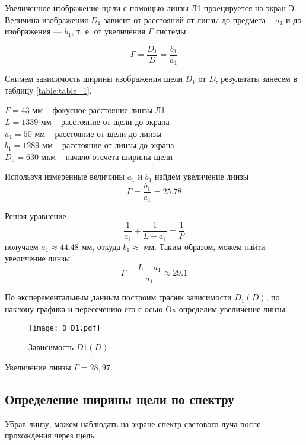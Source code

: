 	Увеличенное изображение щели с помощью линзы Л1 проецируется на экран Э. Величина изображения $D_1$ зависит от расстояний от линзы до предмета -- $a_1$ и до изображения — $b_1$, т. е. от увеличения $\Gamma$ системы:
	
	\begin{equation}
		\Gamma=\frac{D_{1}}{D}=\frac{b_{1}}{a_{1}}
	\end{equation}
	
	Снимем зависимость ширины изображения щели $D_1$ от $D$, результаты занесем в таблицу \ref{table:table_1}.
	
	
	
	\begin{center}
		$F = 43$ мм -- фокусное расстояние линзы Л1 \\
		$L = 1339$ мм -- расстояние от щели до экрана \\
		$a_1 = 50$ мм -- расстояние от щели до линзы \\
		$b_1 = 1289$ мм -- расстояние от линзы до экрана \\
		$D_0 = 630$ мкм -- начало отсчета ширины щели \\
	\end{center}

	Используя измеренные величины $a_1$ и $b_1$ найдем увеличение линзы
	\[ \Gamma = \frac{b_1}{a_1} = 25.78 \]

	Решая уравнение
	\[ \frac{1}{a_1} + \frac{1}{L - a_1} = \frac{1}{F} \]
	получаем $a_1 \approx 44.48$ мм, откуда $b_1 \approx$ мм. Таким образом, можем найти увеличение линзы
	\[ \Gamma = \frac{L - a_1}{a_1} \approx 29.1 \]
    
    По эксперементальным данным построим график зависимости $D_1(D)$, по наклону графика и пересечению его с осью Ox определим увеличение линзы.
    
    \begin{figure}
    	\centering
    	\texttt{[image: D\_D1.pdf]}
    	\caption{Зависимость $D1(D)$}
    \end{figure}

	Увеличение линзы $\Gamma = 28,97$.
    
    \subsection{Определение ширины щели по спектру}
    
    Убрав линзу, можем наблюдать на экране спектр светового луча после прохождения через щель.
    
